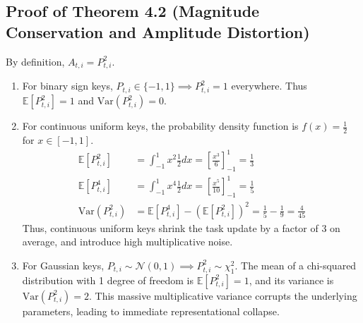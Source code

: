 \documentclass{article}
\theoremstyle{plain}
\theoremstyle{definition}
\theoremstyle{remark}
\begin{document}
\subsection{Proof of Theorem 4.2 (Magnitude Conservation and Amplitude Distortion)}
\label{proof:distortion}
By definition, $A_{t,i} = P_{t,i}^2$.
\begin{enumerate}
    \item For binary sign keys, $P_{t,i} \in \{-1, 1\} \implies P_{t,i}^2 = 1$ everywhere. Thus $\mathbb{E}[P_{t,i}^2] = 1$ and $\text{Var}(P_{t,i}^2) = 0$.
    \item For continuous uniform keys, the probability density function is $f(x) = \frac{1}{2}$ for $x \in [-1, 1]$.
    \begin{align*}
        \mathbb{E}[P_{t,i}^2] &= \int_{-1}^1 x^2 \frac{1}{2} dx = \left[ \frac{x^3}{6} \right]_{-1}^1 = \frac{1}{3} \\
        \mathbb{E}[P_{t,i}^4] &= \int_{-1}^1 x^4 \frac{1}{2} dx = \left[ \frac{x^5}{10} \right]_{-1}^1 = \frac{1}{5} \\
        \text{Var}(P_{t,i}^2) &= \mathbb{E}[P_{t,i}^4] - (\mathbb{E}[P_{t,i}^2])^2 = \frac{1}{5} - \frac{1}{9} = \frac{4}{45}
    \end{align*}
    Thus, continuous uniform keys shrink the task update by a factor of 3 on average, and introduce high multiplicative noise.
    \item For Gaussian keys, $P_{t,i} \sim \mathcal{N}(0, 1) \implies P_{t,i}^2 \sim \chi^2_1$. The mean of a chi-squared distribution with 1 degree of freedom is $\mathbb{E}[P_{t,i}^2] = 1$, and its variance is $\text{Var}(P_{t,i}^2) = 2$. This massive multiplicative variance corrupts the underlying parameters, leading to immediate representational collapse.
\end{enumerate}
\end{document}
